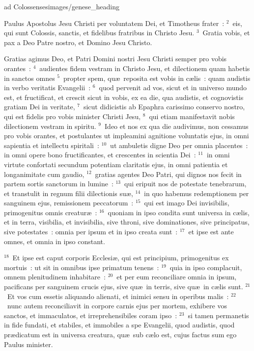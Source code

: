 {ad Colossenses}{images/genese_heading}


\lettrine[lines=6,image=true,loversize=0.05,lraise=-0.03]{P}{}aulus Apostolus Jesu Christi per voluntatem Dei, et Timotheus frater~:
${}^{2}$~eis, qui sunt Colossis, sanctis, et fidelibus fratribus in Christo Jesu.
${}^{3}$~Gratia vobis, et pax a Deo Patre nostro, et Domino Jesu Christo.

 Gratias agimus Deo, et Patri Domini nostri Jesu Christi semper pro vobis orantes~:
${}^{4}$~audientes fidem vestram in Christo Jesu, et dilectionem quam habetis in sanctos omnes
${}^{5}$~propter spem, qu\ae\ reposita est vobis in c\ae lis~: quam audistis in verbo veritatis Evangelii~:
${}^{6}$~quod pervenit ad vos, sicut et in universo mundo est, et fructificat, et crescit sicut in vobis, ex ea die, qua audistis, et cognovistis gratiam Dei in veritate,
${}^{7}$~sicut didicistis ab Epaphra carissimo conservo nostro, qui est fidelis pro vobis minister Christi Jesu,
${}^{8}$~qui etiam manifestavit nobis dilectionem vestram in spiritu.
${}^{9}$~Ideo et nos ex qua die audivimus, non cessamus pro vobis orantes, et postulantes ut impleamini agnitione voluntatis ejus, in omni sapientia et intellectu spiritali~:
${}^{10}$~ut ambuletis digne Deo per omnia placentes~: in omni opere bono fructificantes, et crescentes in scientia Dei~:
${}^{11}$~in omni virtute confortati secundum potentiam claritatis ejus, in omni patientia et longanimitate cum gaudio,
${}^{12}$~gratias agentes Deo Patri, qui dignos nos fecit in partem sortis sanctorum in lumine~:
${}^{13}$~qui eripuit nos de potestate tenebrarum, et transtulit in regnum filii dilectionis su\ae ,
${}^{14}$~in quo habemus redemptionem per sanguinem ejus, remissionem peccatorum~:
${}^{15}$~qui est imago Dei invisibilis, primogenitus omnis creatur\ae~:
${}^{16}$~quoniam in ipso condita sunt universa in c\ae lis, et in terra, visibilia, et invisibilia, sive throni, sive dominationes, sive principatus, sive potestates~: omnia per ipsum et in ipso creata sunt~:
${}^{17}$~et ipse est ante omnes, et omnia in ipso constant.


${}^{18}$~Et ipse est caput corporis Ecclesi\ae , qui est principium, primogenitus ex mortuis~: ut sit in omnibus ipse primatum tenens~:
${}^{19}$~quia in ipso complacuit, omnem plenitudinem inhabitare~:
${}^{20}$~et per eum reconciliare omnia in ipsum, pacificans per sanguinem crucis ejus, sive qu\ae\ in terris, sive qu\ae\ in c\ae lis sunt.
${}^{21}$~Et vos cum essetis aliquando alienati, et inimici sensu in operibus malis~:
${}^{22}$~nunc autem reconciliavit in corpore carnis ejus per mortem, exhibere vos sanctos, et immaculatos, et irreprehensibiles coram ipso~:
${}^{23}$~si tamen permanetis in fide fundati, et stabiles, et immobiles a spe Evangelii, quod audistis, quod pr\ae dicatum est in universa creatura, qu\ae\ sub c\ae lo est, cujus factus sum ego Paulus minister.


